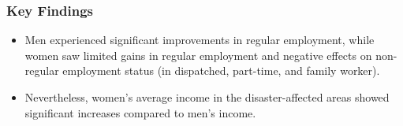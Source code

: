 \documentclass[serif, aspectratio=169]{beamer}
\begin{document}

\begin{frame}[label=summary]
\frametitle{Key Findings}
{\Large
\begin{itemize}
    \item Men experienced significant improvements in regular employment, while women saw limited gains in regular employment and negative effects on non-regular employment status (in dispatched, part-time, and family worker).
\vspace{0.5cm}
    
    \item Nevertheless, women’s average income in the disaster-affected areas showed significant increases compared to men's income.
\end{itemize}
}
\end{frame}

\end{document}
